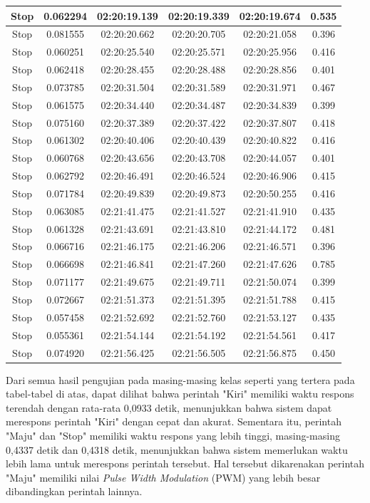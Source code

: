 \begin{longtable}{|c|c|c|c|c|c|}
      Stop & 0.062294 & 02:20:19.139 & 02:20:19.339 & 02:20:19.674  & 0.535 \\ \hline
      Stop & 0.081555 & 02:20:20.662 & 02:20:20.705 & 02:20:21.058 & 0.396 \\ \hline
      Stop & 0.060251 & 02:20:25.540 & 02:20:25.571 & 02:20:25.956 & 0.416 \\ \hline
      Stop & 0.062418 & 02:20:28.455 & 02:20:28.488  & 02:20:28.856 & 0.401 \\ \hline
      Stop & 0.073785 & 02:20:31.504 & 02:20:31.589 & 02:20:31.971 & 0.467 \\ \hline
      Stop & 0.061575 & 02:20:34.440 & 02:20:34.487 & 02:20:34.839 & 0.399 \\ \hline
      Stop & 0.075160 & 02:20:37.389 & 02:20:37.422 & 02:20:37.807 & 0.418 \\ \hline
      Stop & 0.061302 & 02:20:40.406 & 02:20:40.439 & 02:20:40.822 & 0.416 \\ \hline
      Stop & 0.060768 & 02:20:43.656 & 02:20:43.708 & 02:20:44.057 & 0.401 \\ \hline
      Stop & 0.062792 & 02:20:46.491 & 02:20:46.524 & 02:20:46.906 & 0.415 \\ \hline
      Stop & 0.071784 & 02:20:49.839 & 02:20:49.873 & 02:20:50.255 & 0.416 \\ \hline
      Stop & 0.063085 & 02:21:41.475 & 02:21:41.527 & 02:21:41.910 & 0.435 \\ \hline
      Stop & 0.061328 & 02:21:43.691 & 02:21:43.810 & 02:21:44.172 & 0.481 \\ \hline
      Stop & 0.066716 & 02:21:46.175 & 02:21:46.206 & 02:21:46.571 & 0.396 \\ \hline
      Stop & 0.066698 & 02:21:46.841 & 02:21:47.260 & 02:21:47.626 & 0.785 \\ \hline
      Stop & 0.071177 & 02:21:49.675 & 02:21:49.711 & 02:21:50.074 & 0.399 \\ \hline
      Stop & 0.072667 & 02:21:51.373 & 02:21:51.395 & 02:21:51.788 & 0.415 \\ \hline
      Stop & 0.057458 & 02:21:52.692 & 02:21:52.760 & 02:21:53.127 & 0.435 \\ \hline
      Stop & 0.055361 & 02:21:54.144 & 02:21:54.192 & 02:21:54.561 & 0.417 \\ \hline
      Stop & 0.074920 & 02:21:56.425 & 02:21:56.505 & 02:21:56.875 & 0.450 \\ \hline
\end{longtable}

Dari semua hasil pengujian pada masing-masing kelas seperti yang tertera pada tabel-tabel di atas, dapat dilihat bahwa perintah "Kiri" memiliki waktu respons terendah dengan rata-rata 0,0933 detik, menunjukkan bahwa sistem dapat merespons perintah "Kiri" dengan cepat dan akurat. Sementara itu, perintah "Maju" dan "Stop" memiliki waktu respons yang lebih tinggi, masing-masing 0,4337 detik dan 0,4318 detik, menunjukkan bahwa sistem memerlukan waktu lebih lama untuk merespons perintah tersebut. Hal tersebut dikarenakan perintah "Maju" memiliki nilai \emph{Pulse Width Modulation} (PWM) yang lebih besar dibandingkan perintah lainnya.

